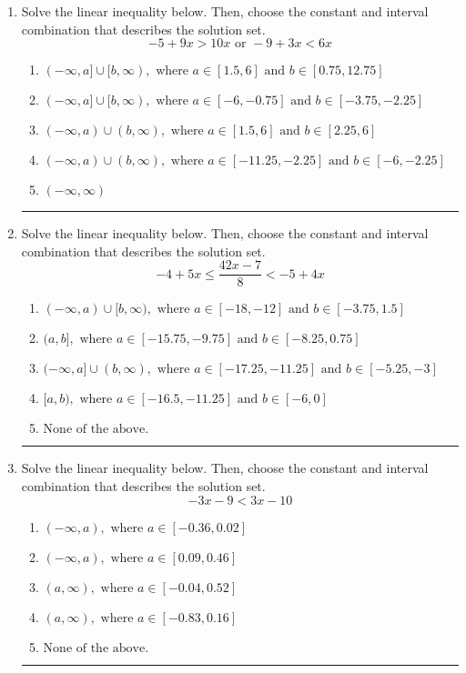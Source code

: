 \documentclass[14pt]{extbook}
\newcommand{\litem}[1]{\item#1\hspace*{-1cm}\rule{\textwidth}{0.4pt}}
\begin{document}
\begin{enumerate}
{\begin{enumerate}[label=\Alph*.]
\end{enumerate} }
\litem{
Solve the linear inequality below. Then, choose the constant and interval combination that describes the solution set.\[ -5 + 9 x > 10 x \text{ or } -9 + 3 x < 6 x \]\begin{enumerate}[label=\Alph*.]
\item \( (-\infty, a] \cup [b, \infty), \text{ where } a \in [1.5, 6] \text{ and } b \in [0.75, 12.75] \)
\item \( (-\infty, a] \cup [b, \infty), \text{ where } a \in [-6, -0.75] \text{ and } b \in [-3.75, -2.25] \)
\item \( (-\infty, a) \cup (b, \infty), \text{ where } a \in [1.5, 6] \text{ and } b \in [2.25, 6] \)
\item \( (-\infty, a) \cup (b, \infty), \text{ where } a \in [-11.25, -2.25] \text{ and } b \in [-6, -2.25] \)
\item \( (-\infty, \infty) \)

\end{enumerate} }
\litem{
Solve the linear inequality below. Then, choose the constant and interval combination that describes the solution set.\[ -4 + 5 x \leq \frac{42 x - 7}{8} < -5 + 4 x \]\begin{enumerate}[label=\Alph*.]
\item \( (-\infty, a) \cup [b, \infty), \text{ where } a \in [-18, -12] \text{ and } b \in [-3.75, 1.5] \)
\item \( (a, b], \text{ where } a \in [-15.75, -9.75] \text{ and } b \in [-8.25, 0.75] \)
\item \( (-\infty, a] \cup (b, \infty), \text{ where } a \in [-17.25, -11.25] \text{ and } b \in [-5.25, -3] \)
\item \( [a, b), \text{ where } a \in [-16.5, -11.25] \text{ and } b \in [-6, 0] \)
\item \( \text{None of the above.} \)

\end{enumerate} }
\litem{
Solve the linear inequality below. Then, choose the constant and interval combination that describes the solution set.\[ -3x -9 < 3x -10 \]\begin{enumerate}[label=\Alph*.]
\item \( (-\infty, a), \text{ where } a \in [-0.36, 0.02] \)
\item \( (-\infty, a), \text{ where } a \in [0.09, 0.46] \)
\item \( (a, \infty), \text{ where } a \in [-0.04, 0.52] \)
\item \( (a, \infty), \text{ where } a \in [-0.83, 0.16] \)
\item \( \text{None of the above}. \)


\end{enumerate}}
\end{enumerate}
\end{document}
